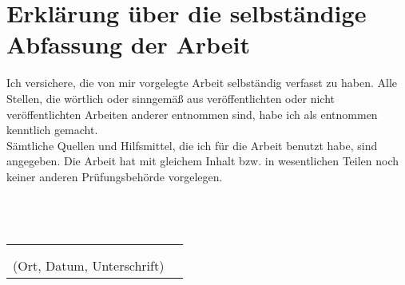 \chapter*{Erklärung über die selbständige\\Abfassung der Arbeit}
Ich versichere, die von mir vorgelegte Arbeit selbständig verfasst zu haben.
Alle Stellen, die wörtlich oder sinngemäß aus veröffentlichten oder nicht veröffentlichten Arbeiten anderer entnommen sind, habe ich als entnommen kenntlich gemacht.\\
Sämtliche Quellen und Hilfsmittel, die ich für die Arbeit benutzt habe, sind angegeben. Die Arbeit hat mit gleichem Inhalt bzw. in wesentlichen Teilen noch keiner anderen Prüfungsbehörde vorgelegen.
\\\\\\\\
\begin{tabular}{cp{7cm}}
& \\
& \\ \hline
\small (Ort, Datum, Unterschrift) & \normalsize \\
\end{tabular}
